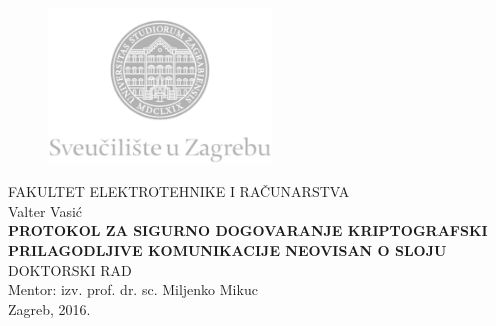 \documentclass[12pt,oneside, a4paper]{book}
\begin{document}
\begin{titlepage}
  \fontsize{16pt}{20pt}\selectfont
  \selectfont
  \setlength{\intextsep}{0pt plus 0pt minus 0pt}

  \begin{center}
    \begin{figure}[ht!]
      \begin{center}
        \includegraphics[height=4.1184cm, width=5.94cm]{logo_unizg2}
      \end{center}
    \end{figure}		
    \vspace{0cm}
    {FAKULTET ELEKTROTEHNIKE I RAČUNARSTVA} \\
    \vspace{3cm}
    Valter Vasić \\
    \vspace{2cm}
    {\fontsize{22pt}{22pt}\selectfont\textbf{PROTOKOL ZA SIGURNO DOGOVARANJE
	    KRIPTOGRAFSKI PRILAGODLJIVE KOMUNIKACIJE NEOVISAN O SLOJU}} \\
    \vspace{2cm}    
    DOKTORSKI RAD \\
    \vspace{5cm}    %
    Mentor: izv. prof. dr. sc. Miljenko Mikuc \\
    \vfill{Zagreb, 2016.}
  \end{center}
  \restoregeometry
\end{titlepage}
\end{document}
